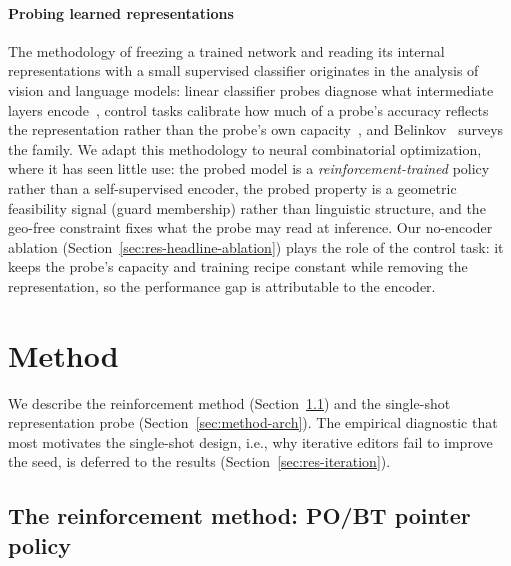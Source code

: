 \documentclass[preprint,10pt]{elsarticle}
\begin{document}
\paragraph{Probing learned representations} The methodology of freezing a trained network and reading its internal representations with a small supervised classifier originates in the analysis of vision and language models: linear classifier probes diagnose what intermediate layers encode~\cite{AlainBengio2017Probes}, control tasks calibrate how much of a probe's accuracy reflects the representation rather than the probe's own capacity~\cite{HewittLiang2019Probes}, and Belinkov~\cite{Belinkov2022Probing} surveys the family. We adapt this methodology to neural combinatorial optimization, where it has seen little use: the probed model is a \emph{reinforcement-trained} policy rather than a self-supervised encoder, the probed property is a geometric feasibility signal (guard membership) rather than linguistic structure, and the geo-free constraint fixes what the probe may read at inference. Our no-encoder ablation (Section~\ref{sec:res-headline-ablation}) plays the role of the control task: it keeps the probe's capacity and training recipe constant while removing the representation, so the performance gap is attributable to the encoder.

\section{Method}
\label{sec:method}

We describe the reinforcement method (Section~\ref{sec:method-pointer}) and the single-shot representation probe (Section~\ref{sec:method-arch}). The empirical diagnostic that most motivates the single-shot design, i.e., why iterative editors fail to improve the seed, is deferred to the results (Section~\ref{sec:res-iteration}).

\subsection{The reinforcement method: PO/BT pointer policy}
\label{sec:method-pointer}
\end{document}
